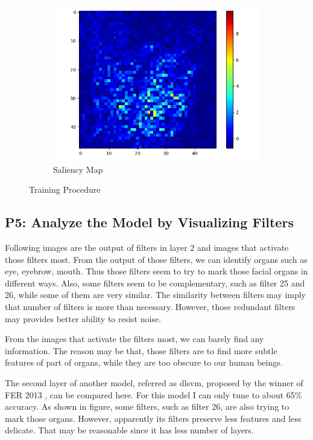 \documentclass[fleqn,a4paper,12pt]{article}
\begin{document}
\begin{figure}[H]
\begin{subfigure}{.33\textwidth}
  \includegraphics[width=\linewidth]{report-imgs/sa.png}
  \caption{Saliency Map}
  \label{fig:sub1}
\end{subfigure}%
\caption{Training Procedure}
\label{fig:test}
\end{figure}


\subsection*{P5: Analyze the Model by Visualizing Filters}

Following images are the output of filters in layer 2 and images that activate those filters most. From the output of those filters, we can identify organs such as eye, eyebrow, mouth. Thus those filters seem to try to mark those facial organs in different ways. Also, some filters seem to be complementary, such as filter 25 and 26, while some of them are very similar. The similarity between filters may imply that number of filters is more than necessary. However, those redundant filters may provides better ability to resist noise.

From the images that activate the filters most, we can barely find any information. The reason may be that, those filters are to find more subtle features of part of organs, while they are too obscure to our human beings.

The second layer of another model, referred as dlsvm, proposed by the winner of FER 2013 \cite{dlsvm}, can be compared here. For this model I can only tune to about 65\% accuracy. As shown in figure, some filters, such as filter 26, are also trying to mark those organs. However, apparently its filters preserve less features and less delicate. That may be reasonable since it has less number of layers.
\end{document}
